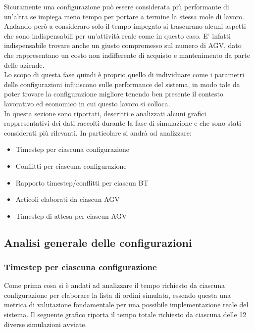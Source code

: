 \documentclass[12pt]{article}
\begin{document}
\noindent Sicuramente una configurazione può essere considerata più performante di un'altra se impiega meno tempo per portare a termine la stessa mole di lavoro. Andando però a consideraro solo il tempo impegato si trascurano alcuni aspetti che sono indispensabili per un'attività reale come in questo caso. E' infatti indispensabile trovare anche un giusto compromesso sul numero di AGV, dato che rappresentano un costo non indifferente di acquisto e mantenimento da parte delle aziende. \\

\noindent Lo scopo di questa fase quindi è proprio quello di individuare come i parametri delle configurazioni influiscono sulle performance del sistema, in modo tale da poter trovare la configurazione migliore tenendo ben presente il contesto lavorativo ed economico in cui questo lavoro si colloca. \\
\noindent In questa sezione sono riportati, descritti e analizzati alcuni grafici rappresentativi dei dati raccolti durante la fase di simulazione e che sono stati considerati più rilevanti. In particolare si andrà ad analizzare:\\

\begin{itemize}
\item Timestep per ciascuna configurazione
\item Conflitti per ciascuna configurazione
\item Rapporto timestep/conflitti per ciascun BT
\item Articoli elaborati da ciascun AGV
\item Timestep di attesa per ciascun AGV
\end{itemize}

\newpage
\subsection{Analisi generale delle configurazioni}
\subsubsection{Timestep per ciascuna configurazione}
Come prima cosa si è andati ad analizzare il tempo richiesto da ciascuna configurazione per elaborare la lista di ordini simulata, essendo questa una metrica di valutazione fondamentale per una possibile implementazione reale del sistema. Il seguente grafico riporta il tempo totale richiesto da ciascuna delle 12 diverse simulazioni avviate. \\
\end{document}
